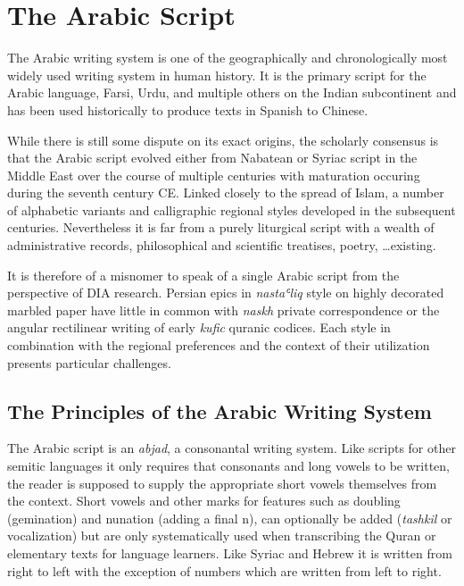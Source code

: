 \chapter{The Arabic Script}
\label{ch:arabic}

The Arabic writing system is one of the geographically and chronologically most
widely used writing system in human history. It is the primary script for the
Arabic language, Farsi, Urdu, and multiple others on the Indian subcontinent
and has been used historically to produce texts in Spanish to Chinese.

While there is still some dispute on its exact origins, the scholarly consensus
is that the Arabic script evolved either from Nabatean or Syriac script in the
Middle East over the course of multiple centuries with maturation occuring
during the seventh century CE.  Linked closely to the spread of Islam, a number
of alphabetic variants and calligraphic regional styles developed in the
subsequent centuries. Nevertheless it is far from a purely liturgical script
with a wealth of administrative records, philosophical and scientific
treatises, poetry, \dots existing.

It is therefore of a misnomer to speak of a single Arabic script from the
perspective of DIA research. Persian epics in \emph{nastaʿliq} style on highly
decorated marbled paper have little in common with \emph{naskh} private
correspondence or the angular rectilinear writing of early \emph{kufic} quranic
codices. Each style in combination with the regional preferences and the
context of their utilization presents particular challenges. 

\section{The Principles of the Arabic Writing System}

The Arabic script is an \emph{abjad}, a consonantal writing system. Like
scripts for other semitic languages it only requires that consonants and long
vowels to be written, the reader is supposed to supply the appropriate short
vowels themselves from the context. Short vowels and other marks for features
such as doubling (gemination) and nunation (adding a final n), can optionally
be added (\emph{tashkil} or vocalization) but are only systematically used when
transcribing the Quran or elementary texts for language learners. Like Syriac
and Hebrew it is written from right to left with the exception of numbers which
are written from left to right.

